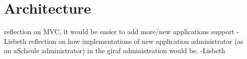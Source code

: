 \section{Architecture}
reflection on MVC, it would be easier to add more/new applications support -Lisbeth
reflection on how implementations of new application administrator (as an aScheule administrator) in the giraf administration would be. -Lisbeth